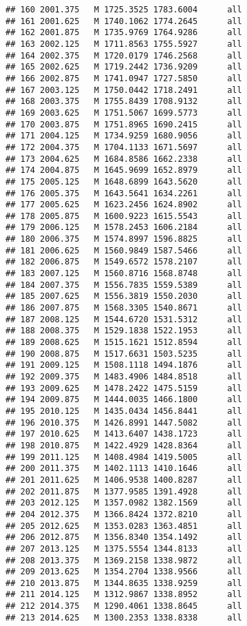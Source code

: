 \documentclass[]{article}
\begin{document}
\begin{verbatim}
## 160 2001.375   M 1725.3525 1783.6004      all
## 161 2001.625   M 1740.1062 1774.2645      all
## 162 2001.875   M 1735.9769 1764.9286      all
## 163 2002.125   M 1711.8563 1755.5927      all
## 164 2002.375   M 1720.0179 1746.2568      all
## 165 2002.625   M 1719.2442 1736.9209      all
## 166 2002.875   M 1741.0947 1727.5850      all
## 167 2003.125   M 1750.0442 1718.2491      all
## 168 2003.375   M 1755.8439 1708.9132      all
## 169 2003.625   M 1751.5067 1699.5773      all
## 170 2003.875   M 1751.8965 1690.2415      all
## 171 2004.125   M 1734.9259 1680.9056      all
## 172 2004.375   M 1704.1133 1671.5697      all
## 173 2004.625   M 1684.8586 1662.2338      all
## 174 2004.875   M 1645.9699 1652.8979      all
## 175 2005.125   M 1648.6899 1643.5620      all
## 176 2005.375   M 1643.5641 1634.2261      all
## 177 2005.625   M 1623.2456 1624.8902      all
## 178 2005.875   M 1600.9223 1615.5543      all
## 179 2006.125   M 1578.2453 1606.2184      all
## 180 2006.375   M 1574.8997 1596.8825      all
## 181 2006.625   M 1560.9849 1587.5466      all
## 182 2006.875   M 1549.6572 1578.2107      all
## 183 2007.125   M 1560.8716 1568.8748      all
## 184 2007.375   M 1556.7835 1559.5389      all
## 185 2007.625   M 1556.3819 1550.2030      all
## 186 2007.875   M 1568.3305 1540.8671      all
## 187 2008.125   M 1544.6720 1531.5312      all
## 188 2008.375   M 1529.1838 1522.1953      all
## 189 2008.625   M 1515.1621 1512.8594      all
## 190 2008.875   M 1517.6631 1503.5235      all
## 191 2009.125   M 1508.1118 1494.1876      all
## 192 2009.375   M 1483.4906 1484.8518      all
## 193 2009.625   M 1478.2422 1475.5159      all
## 194 2009.875   M 1444.0035 1466.1800      all
## 195 2010.125   M 1435.0434 1456.8441      all
## 196 2010.375   M 1426.8991 1447.5082      all
## 197 2010.625   M 1413.6407 1438.1723      all
## 198 2010.875   M 1422.4929 1428.8364      all
## 199 2011.125   M 1408.4984 1419.5005      all
## 200 2011.375   M 1402.1113 1410.1646      all
## 201 2011.625   M 1406.9538 1400.8287      all
## 202 2011.875   M 1377.9585 1391.4928      all
## 203 2012.125   M 1357.0982 1382.1569      all
## 204 2012.375   M 1366.8424 1372.8210      all
## 205 2012.625   M 1353.0283 1363.4851      all
## 206 2012.875   M 1356.8340 1354.1492      all
## 207 2013.125   M 1375.5554 1344.8133      all
## 208 2013.375   M 1369.2158 1338.9872      all
## 209 2013.625   M 1354.2704 1338.9566      all
## 210 2013.875   M 1344.8635 1338.9259      all
## 211 2014.125   M 1312.9867 1338.8952      all
## 212 2014.375   M 1290.4061 1338.8645      all
## 213 2014.625   M 1300.2353 1338.8338      all

\end{verbatim}
\end{document}
